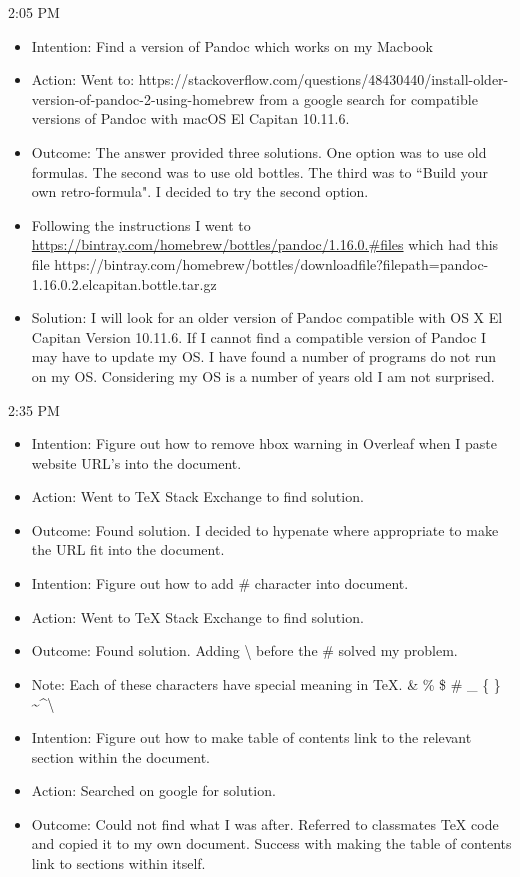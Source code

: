 \documentclass{article}
\begin{document}
2:05 PM

\begin{itemize}
    \item Intention: Find a version of Pandoc which works on my Macbook
    \item Action: Went to: https://stackoverflow.com/questions/48430440/install-older-version-of-pandoc-2-using-homebrew from a google search for compatible versions of Pandoc with macOS El Capitan 10.11.6.
    \item Outcome: The answer provided three solutions. One option was to use old formulas. The second was to use old bottles. The third was to ``Build your own retro-formula". I decided to try the second option.
    \item Following the instructions I went to \href{https://bintray.com/homebrew/bottles/pandoc/1.16.0.\-2\#files}{https://bintray.com/homebrew/bottles/pandoc/1.16.0.\#files} which had this file https://bintray.com/homebrew/bottles/download\textunderscore  file?file\textunderscore path=pandoc-1.16.0\-.2.el\textunderscore capitan.bottle.tar.gz
    \item Solution: I will look for an older version of Pandoc compatible with OS X El Capitan Version 10.11.6. If I cannot find a compatible version of Pandoc I may have to update my OS. I have found a number of programs do not run on my OS. Considering my OS is a number of years old I am not surprised.
\end{itemize}

2:35 PM

\begin{itemize}
    \item Intention: Figure out how to remove hbox warning in Overleaf when I paste website URL's into the document.
    \item Action: Went to TeX Stack Exchange to find solution.
    \item Outcome: Found solution. I decided to hypenate where appropriate to make the URL fit into the document.

    \item Intention: Figure out how to add \# character into document.
    \item Action: Went to TeX Stack Exchange to find solution.
    \item Outcome: Found solution. Adding {\textbackslash} before the \# solved my problem.
    \item Note: Each of these characters have special meaning in TeX. \& \% \$ \# \_ \{ \} \textasciitilde \textasciicircum \textbackslash
    \item Intention: Figure out how to make table of contents link to the relevant section within the document.
    \item Action: Searched on google for solution.
    \item Outcome: Could not find what I was after. Referred to classmates TeX code and copied it to my own document. Success with making the table of contents link to sections within itself.
\end{itemize}
\end{document}
